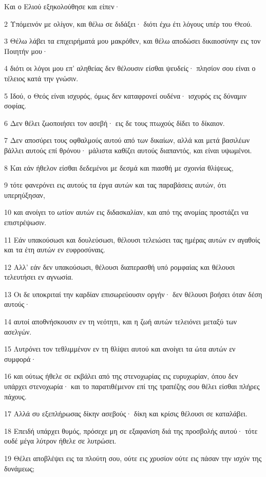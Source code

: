 \par Και ο Ελιού εξηκολούθησε και είπεν·
\par 2 Υπόμεινόν με ολίγον, και θέλω σε διδάξει· διότι έχω έτι λόγους υπέρ του Θεού.
\par 3 Θέλω λάβει τα επιχειρήματά μου μακρόθεν, και θέλω αποδώσει δικαιοσύνην εις τον Ποιητήν μου·
\par 4 διότι οι λόγοι μου επ' αληθείας δεν θέλουσιν είσθαι ψευδείς· πλησίον σου είναι ο τέλειος κατά την γνώσιν.
\par 5 Ιδού, ο Θεός είναι ισχυρός, όμως δεν καταφρονεί ουδένα· ισχυρός εις δύναμιν σοφίας.
\par 6 Δεν θέλει ζωοποιήσει τον ασεβή· εις δε τους πτωχούς δίδει το δίκαιον.
\par 7 Δεν αποσύρει τους οφθαλμούς αυτού από των δικαίων, αλλά και μετά βασιλέων βάλλει αυτούς επί θρόνου· μάλιστα καθίζει αυτούς διαπαντός, και είναι υψωμένοι.
\par 8 Και εάν ήθελον είσθαι δεδεμένοι με δεσμά και πιασθή με σχοινία θλίψεως,
\par 9 τότε φανερόνει εις αυτούς τα έργα αυτών και τας παραβάσεις αυτών, ότι υπερηύξησαν,
\par 10 και ανοίγει το ωτίον αυτών εις διδασκαλίαν, και από της ανομίας προστάζει να επιστρέψωσιν.
\par 11 Εάν υπακούσωσι και δουλεύσωσι, θέλουσι τελειώσει τας ημέρας αυτών εν αγαθοίς και τα έτη αυτών εν ευφροσύναις.
\par 12 Αλλ' εάν δεν υπακούσωσι, θέλουσι διαπερασθή υπό ρομφαίας και θέλουσι τελευτήσει εν αγνωσία.
\par 13 Οι δε υποκριταί την καρδίαν επισωρεύουσιν οργήν· δεν θέλουσι βοήσει όταν δέση αυτούς·
\par 14 αυτοί αποθνήσκουσιν εν τη νεότητι, και η ζωή αυτών τελειόνει μεταξύ των ασελγών.
\par 15 Λυτρόνει τον τεθλιμμένον εν τη θλίψει αυτού και ανοίγει τα ώτα αυτών εν συμφορά·
\par 16 και ούτως ήθελε σε εκβάλει από της στενοχωρίας εις ευρυχωρίαν, όπου δεν υπάρχει στενοχωρία· και το παρατιθέμενον επί της τραπέζης σου θέλει είσθαι πλήρες πάχους.
\par 17 Αλλά συ εξεπλήρωσας δίκην ασεβούς· δίκη και κρίσις θέλουσι σε καταλάβει.
\par 18 Επειδή υπάρχει θυμός, πρόσεχε μη σε εξαφανίση διά της προσβολής αυτού· τότε ουδέ μέγα λύτρον ήθελε σε λυτρώσει.
\par 19 Θέλει αποβλέψει εις τα πλούτη σου, ούτε εις χρυσίον ούτε εις πάσαν την ισχύν της δυνάμεως;

